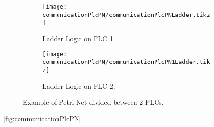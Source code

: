 \begin{figure}[H]
    \centering
    \begin{subfigure}[t]{0.45\textwidth}
        \centering
        \texttt{[image: communicationPlcPN/communicationPlcPNLadder.tikz]}
        \caption{Ladder Logic on PLC 1.}
        \label{fig:communicationPlcPN}
    \end{subfigure}%
\hfill
    \begin{subfigure}[t]{0.45\textwidth}
        \centering
        \texttt{[image: communicationPlcPN/communicationPlcPN1Ladder.tikz]}
  \caption{Ladder Logic on PLC 2.}
  \label{fig:communicationPlcPN1}
    \end{subfigure}
    \caption{Example of Petri Net divided between 2 PLCs.}
\end{figure}
  

\autoref{fig:communicationPlcPN}
